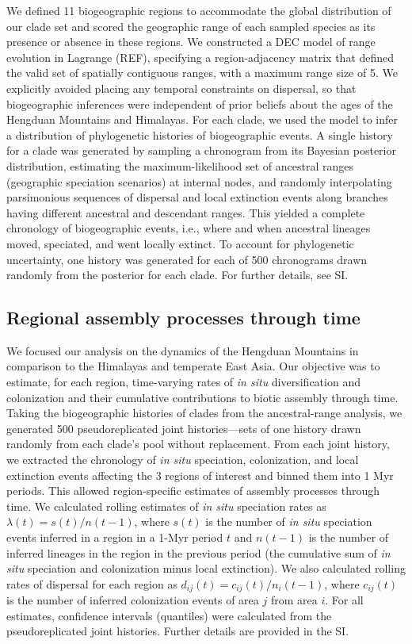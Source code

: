 We defined 11 biogeographic regions to accommodate the global distribution of our clade set and scored the geographic range of each sampled species as its presence or absence in these regions. We constructed a DEC model of range evolution in Lagrange (REF), specifying a region-adjacency matrix that defined the valid set of spatially contiguous ranges, with a maximum range size of 5. We explicitly avoided placing any temporal constraints on dispersal, so that biogeographic inferences were independent of prior beliefs about the ages of the Hengduan Mountains and Himalayas. For each clade, we used the model to infer a distribution of phylogenetic histories of biogeographic events. A single history for a clade was generated by sampling a chronogram from its Bayesian posterior distribution, estimating the maximum-likelihood set of ancestral ranges (geographic speciation scenarios) at internal nodes, and randomly interpolating parsimonious sequences of dispersal and local extinction events along branches having different ancestral and descendant ranges. This yielded a complete chronology of biogeographic events, i.e., where and when ancestral lineages moved, speciated, and went locally extinct. To account for phylogenetic uncertainty, one history was generated for each of 500 chronograms drawn randomly from the posterior for each clade. For further details, see SI.

\subsection{Regional assembly processes through time}

We focused our analysis on the dynamics of the Hengduan Mountains in comparison to the Himalayas and temperate East Asia. Our objective was to estimate, for each region, time-varying rates of \textit{in situ} diversification and colonization and their cumulative contributions to biotic assembly through time. Taking the biogeographic histories of clades from the ancestral-range analysis, we generated 500 pseudoreplicated joint histories---sets of one history drawn randomly from each clade's pool without replacement. From each joint history, we extracted the chronology of \textit{in situ} speciation, colonization, and local extinction events affecting the 3 regions of interest and binned them into 1 Myr periods. This allowed region-specific estimates of assembly processes through time. We calculated rolling estimates of \textit{in situ} speciation rates as $\lambda(t) = s(t)/n(t-1)$, where $s(t)$ is the number of \textit{in situ} speciation events inferred in a region in a 1-Myr period $t$ and $n(t-1)$ is the number of inferred lineages in the region in the previous period (the cumulative sum of \textit{in situ} speciation and colonization minus local extinction). We also calculated rolling rates of dispersal for each region as $d_{ij}(t) = c_{ij}(t)/n_i(t-1)$, where $c_{ij}(t)$ is the number of inferred colonization events of area $j$ from area $i$. For all estimates, confidence intervals (quantiles) were calculated from the pseudoreplicated joint histories. Further details are provided in the SI.